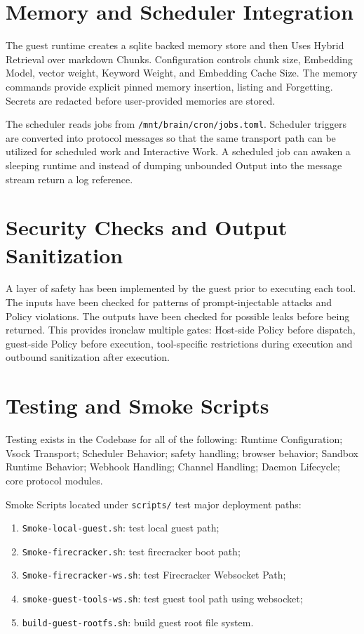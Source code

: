 \section{Memory and Scheduler Integration}
The guest runtime creates a sqlite backed memory store and then Uses Hybrid
Retrieval over markdown Chunks. Configuration controls chunk size, Embedding
Model, vector weight, Keyword Weight, and Embedding Cache Size. The memory
commands provide explicit pinned memory insertion, listing and Forgetting.
Secrets are redacted before user-provided memories are stored.

The scheduler reads jobs from \texttt{/mnt/brain/cron/jobs.toml}. Scheduler
triggers are converted into protocol messages so that the same transport path
can be utilized for scheduled work and Interactive Work. A scheduled job can
awaken a sleeping runtime and instead of dumping unbounded Output into the
message stream return a log reference.

\section{Security Checks and Output Sanitization}
A layer of safety has been implemented by the guest prior to executing each tool.
The inputs have been checked for patterns of prompt-injectable attacks and Policy
violations. The outputs have been checked for possible leaks before being
returned. This provides ironclaw multiple gates: Host-side Policy before
dispatch, guest-side Policy before execution, tool-specific restrictions during
execution and outbound sanitization after execution.

\section{Testing and Smoke Scripts}
Testing exists in the Codebase for all of the following: Runtime Configuration;
Vsock Transport; Scheduler Behavior; safety handling; browser behavior; Sandbox
Runtime Behavior; Webhook Handling; Channel Handling; Daemon Lifecycle; core
protocol modules.

Smoke Scripts located under \texttt{scripts/} test major deployment paths:
\begin{enumerate}
    \item \texttt{Smoke-local-guest.sh}: test local guest path;
    \item \texttt{Smoke-firecracker.sh}: test firecracker boot path;
    \item \texttt{Smoke-firecracker-ws.sh}: test Firecracker Websocket Path;
    \item \texttt{smoke-guest-tools-ws.sh}: test guest tool path using websocket;
    \item \texttt{build-guest-rootfs.sh}: build guest root file system.
\end{enumerate}

\fussy
